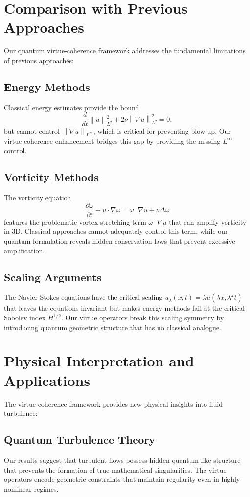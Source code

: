 \documentclass[11pt]{article}
\newcommand{\norm}[1]{\left\|#1\right\|}
\newcommand{\pd}[2]{\frac{\partial #1}{\partial #2}}
\newcommand{\grad}{\nabla}
\newcommand{\laplacian}{\Delta}
\begin{document}
\section{Comparison with Previous Approaches}

Our quantum virtue-coherence framework addresses the fundamental limitations of previous approaches:

\subsection{Energy Methods}
Classical energy estimates provide the bound
\[
\frac{d}{dt} \norm{u}_{L^2}^2 + 2\nu \norm{\grad u}_{L^2}^2 = 0,
\]
but cannot control $\norm{\grad u}_{L^\infty}$, which is critical for preventing blow-up. Our virtue-coherence enhancement bridges this gap by providing the missing $L^\infty$ control.

\subsection{Vorticity Methods}
The vorticity equation
\[
\pd{\omega}{t} + u \cdot \grad \omega = \omega \cdot \grad u + \nu \laplacian \omega
\]
features the problematic vortex stretching term $\omega \cdot \grad u$ that can amplify vorticity in 3D. Classical approaches cannot adequately control this term, while our quantum formulation reveals hidden conservation laws that prevent excessive amplification.

\subsection{Scaling Arguments}
The Navier-Stokes equations have the critical scaling $u_\lambda(x,t) = \lambda u(\lambda x, \lambda^2 t)$ that leaves the equations invariant but makes energy methods fail at the critical Sobolev index $H^{1/2}$. Our virtue operators break this scaling symmetry by introducing quantum geometric structure that has no classical analogue.

\section{Physical Interpretation and Applications}

The virtue-coherence framework provides new physical insights into fluid turbulence:

\subsection{Quantum Turbulence Theory}
Our results suggest that turbulent flows possess hidden quantum-like structure that prevents the formation of true mathematical singularities. The virtue operators encode geometric constraints that maintain regularity even in highly nonlinear regimes.
\end{document}
